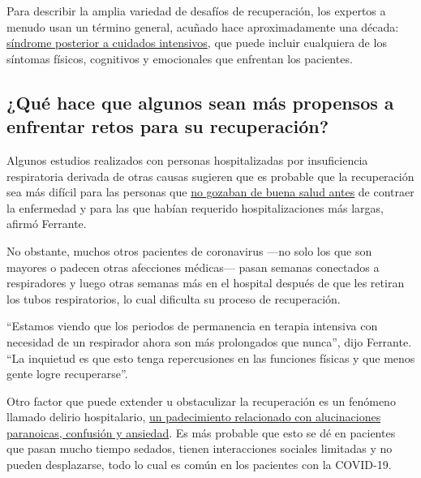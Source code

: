 Para describir la amplia variedad de desafíos de recuperación, los
expertos a menudo usan un término general, acuñado hace aproximadamente
una década:
\href{https://www.sccm.org/MyICUCare/THRIVE/Post-intensive-Care-Syndrome\#:~:text=Post\%2Dintensive\%20care\%20syndrome\%2C\%20or\%20PICS\%2C\%20is\%20made\%20up,and\%20may\%20affect\%20the\%20family.}{síndrome
posterior a cuidados intensivos}, que puede incluir cualquiera de los
síntomas físicos, cognitivos y emocionales que enfrentan los pacientes.

\hypertarget{quuxe9-hace-que-algunos-sean-muxe1s-propensos-a-enfrentar-retos-para-su-recuperaciuxf3n}{%
\subsection{¿Qué hace que algunos sean más propensos a enfrentar retos
para su
recuperación?}\label{quuxe9-hace-que-algunos-sean-muxe1s-propensos-a-enfrentar-retos-para-su-recuperaciuxf3n}}

Algunos estudios realizados con personas hospitalizadas por
insuficiencia respiratoria derivada de otras causas sugieren que es
probable que la recuperación sea más difícil para las personas que
\href{https://www.ncbi.nlm.nih.gov/pmc/articles/PMC6026287/}{no gozaban
de buena salud antes} de contraer la enfermedad y para las que habían
requerido hospitalizaciones más largas, afirmó Ferrante.

No obstante, muchos otros pacientes de coronavirus ---no solo los que
son mayores o padecen otras afecciones médicas--- pasan semanas
conectados a respiradores y luego otras semanas más en el hospital
después de que les retiran los tubos respiratorios, lo cual dificulta su
proceso de recuperación.

``Estamos viendo que los periodos de permanencia en terapia intensiva
con necesidad de un respirador ahora son más prolongados que nunca'',
dijo Ferrante. ``La inquietud es que esto tenga repercusiones en las
funciones físicas y que menos gente logre recuperarse''.

Otro factor que puede extender u obstaculizar la recuperación es un
fenómeno llamado delirio hospitalario,
\href{https://www.nytimes.com/es/2020/07/01/espanol/ciencia-y-tecnologia/coronavirus-delirio-alucinaciones.html}{un
padecimiento relacionado con alucinaciones paranoicas, confusión y
ansiedad}. Es más probable que esto se dé en pacientes que pasan mucho
tiempo sedados, tienen interacciones sociales limitadas y no pueden
desplazarse, todo lo cual es común en los pacientes con la COVID-19.

